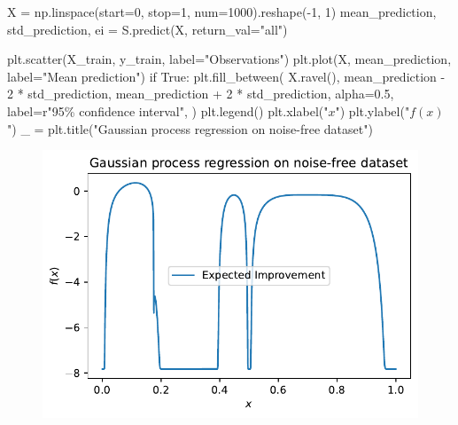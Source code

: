 \documentclass[
  letterpaper,
  DIV=11,
  numbers=noendperiod]{scrreprt}
\newenvironment{Shaded}{\begin{snugshade}}{\end{snugshade}}
\newcommand{\ControlFlowTok}[1]{\textcolor[rgb]{0.00,0.23,0.31}{#1}}
\newcommand{\DecValTok}[1]{\textcolor[rgb]{0.68,0.00,0.00}{#1}}
\newcommand{\FloatTok}[1]{\textcolor[rgb]{0.68,0.00,0.00}{#1}}
\newcommand{\NormalTok}[1]{\textcolor[rgb]{0.00,0.23,0.31}{#1}}
\newcommand{\OperatorTok}[1]{\textcolor[rgb]{0.37,0.37,0.37}{#1}}
\newcommand{\SpecialCharTok}[1]{\textcolor[rgb]{0.37,0.37,0.37}{#1}}
\newcommand{\StringTok}[1]{\textcolor[rgb]{0.13,0.47,0.30}{#1}}
\newcommand{\VariableTok}[1]{\textcolor[rgb]{0.07,0.07,0.07}{#1}}
\newcommand{\VerbatimStringTok}[1]{\textcolor[rgb]{0.13,0.47,0.30}{#1}}
\begin{document}
\begin{Shaded}
\begin{Highlighting}[]
\NormalTok{X }\OperatorTok{=}\NormalTok{ np.linspace(start}\OperatorTok{=}\DecValTok{0}\NormalTok{, stop}\OperatorTok{=}\DecValTok{1}\NormalTok{, num}\OperatorTok{=}\DecValTok{1000}\NormalTok{).reshape(}\OperatorTok{{-}}\DecValTok{1}\NormalTok{, }\DecValTok{1}\NormalTok{)}
\NormalTok{mean\_prediction, std\_prediction, ei }\OperatorTok{=}\NormalTok{ S.predict(X, return\_val}\OperatorTok{=}\StringTok{"all"}\NormalTok{)}

\NormalTok{plt.scatter(X\_train, y\_train, label}\OperatorTok{=}\StringTok{"Observations"}\NormalTok{)}
\NormalTok{plt.plot(X, mean\_prediction, label}\OperatorTok{=}\StringTok{"Mean prediction"}\NormalTok{)}
\ControlFlowTok{if} \VariableTok{True}\NormalTok{:}
\NormalTok{    plt.fill\_between(}
\NormalTok{        X.ravel(),}
\NormalTok{        mean\_prediction }\OperatorTok{{-}} \DecValTok{2} \OperatorTok{*}\NormalTok{ std\_prediction,}
\NormalTok{        mean\_prediction }\OperatorTok{+} \DecValTok{2} \OperatorTok{*}\NormalTok{ std\_prediction,}
\NormalTok{        alpha}\OperatorTok{=}\FloatTok{0.5}\NormalTok{,}
\NormalTok{        label}\OperatorTok{=}\VerbatimStringTok{r"95}\SpecialCharTok{\% c}\VerbatimStringTok{onfidence interval"}\NormalTok{,}
\NormalTok{    )}
\NormalTok{plt.legend()}
\NormalTok{plt.xlabel(}\StringTok{"$x$"}\NormalTok{)}
\NormalTok{plt.ylabel(}\StringTok{"$f(x)$"}\NormalTok{)}
\NormalTok{\_ }\OperatorTok{=}\NormalTok{ plt.title(}\StringTok{"Gaussian process regression on noise{-}free dataset"}\NormalTok{)}
\end{Highlighting}
\end{Shaded}

\begin{figure}[H]

{\centering \includegraphics{012_num_spot_ei_files/figure-pdf/cell-48-output-1.pdf}

}

\end{figure}
\end{document}

